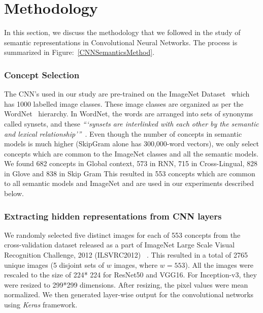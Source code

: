 \section{Methodology}

In this section, we discuss the methodology that we followed in the study of semantic representations in Convolutional Neural Networks. The process is summarized in Figure:~\ref{CNNSemanticsMethod}.

\subsubsection{Concept Selection}
The CNN’s used in our study are pre-trained on the ImageNet Dataset~\cite{ImageNet2009} which has 1000 labelled image classes. These image classes are organized as per the WordNet~\cite{wordnet} hierarchy. In WordNet, the words are arranged into sets of synonyms called synsets, and these \textit{```synsets are interlinked with each other by the semantic and lexical relationship'''}~\cite{wordnet}. Even though the number of concepts in semantic models is much higher (SkipGram alone has 300,000-word vectors), we only select concepts which are common to the ImageNet classes and all the semantic models. We found 682 concepts in Global context, 573 in RNN, 715 in Cross-Lingual, 828 in Glove and 838 in Skip Gram  This resulted in 553  concepts which are common to all semantic models and ImageNet and are used in our experiments described below.

\subsubsection{Extracting hidden representations from CNN layers}

We randomly selected five distinct images for each of 553 concepts from the cross-validation dataset released as a part of ImageNet Large Scale Visual Recognition Challenge, 2012 (ILSVRC2012) ~\cite{ImageNETChallenge}. This resulted in a total of 2765 unique images (5 disjoint sets of $w$ images, where $w=553$). All the images were rescaled to the size of 224* 224 for ResNet50 and VGG16. For Inception-v3, they were resized to 299*299 dimensions. After resizing, the pixel values were mean normalized. We then generated layer-wise output for the convolutional networks using \textit{Keras} framework. 

